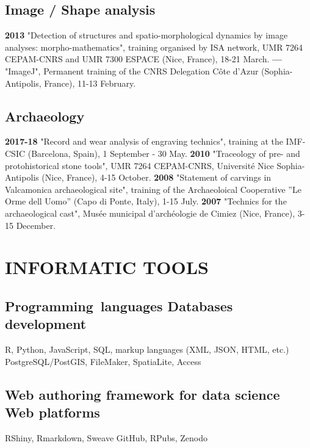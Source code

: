 \documentclass[11pt]{report} %
\begin{document}
\subsection*{Image / Shape analysis}

\textbf{2013 }"Detection of structures and spatio-morphological dynamics by image analyses: morpho-mathematics", training organised by ISA network, UMR 7264 CEPAM-CNRS and UMR 7300 ESPACE (Nice, France), 18-21 March.
\smallbreak
\textbf{---  }"ImageJ", Permanent training of the CNRS Delegation C\^{o}te d'Azur (Sophia-Antipolis, France), 11-13 February.

\subsection*{Archaeology}

\textbf{2017-18 } "Record and wear analysis of engraving technics", training at the IMF-CSIC (Barcelona, Spain), 1 September - 30 May.
\smallbreak
\textbf{2010 } "Traceology of pre- and protohistorical stone tools", UMR 7264 CEPAM-CNRS, Universit\'{e} Nice Sophia-Antipolis (Nice, France), 4-15 October.
\smallbreak
\textbf{2008 } "Statement of carvings in Valcamonica archaeological site", training of the Archaeoloical Cooperative ''Le Orme dell Uomo'' (Capo di Ponte, Italy), 1-15 July.
\smallbreak
\textbf{2007 } "Technics for the archaeological cast", Mus\'{e}e municipal d'arch\'{e}ologie de Cimiez (Nice, France), 3-15 December.

\section*{INFORMATIC TOOLS}

\subsection*{Programming~languages {\textbar} Databases development}

\textsf{R}, \textsf{Python}, \textsf{JavaScript}, SQL, markup languages (XML, JSON, HTML, etc.)~\textbf{{\textbar}} PostgreSQL/PostGIS, FileMaker, SpatiaLite, Access

\subsection*{Web authoring framework for data science {\textbar} Web platforms}

RShiny, Rmarkdown, Sweave \textbf{{\textbar}} GitHub, RPubs, Zenodo
\end{document}
